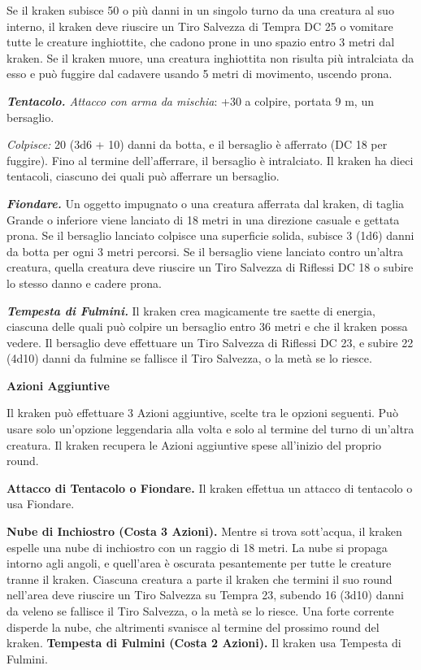 \begin{multicols}{2}
	Se il kraken subisce 50 o più danni in un singolo turno da una creatura al suo interno, il kraken deve riuscire un Tiro Salvezza di Tempra DC 25 o vomitare tutte le creature inghiottite, che cadono prone in uno spazio entro 3 metri dal kraken. Se il kraken muore, una creatura inghiottita non risulta più intralciata da esso e può fuggire dal cadavere usando 5 metri di movimento, uscendo prona.

	\textit{\textbf{Tentacolo.} Attacco con arma da mischia}: +30 a colpire, portata 9 m, un bersaglio.

	\textit{Colpisce:} 20 (3d6 + 10) danni da botta, e il bersaglio è afferrato (DC 18 per fuggire). Fino al termine dell'afferrare, il bersaglio è intralciato. Il kraken ha dieci tentacoli, ciascuno dei quali può afferrare un bersaglio.

	\textit{\textbf{Fiondare.}} Un oggetto impugnato o una creatura afferrata dal kraken, di taglia Grande o inferiore viene lanciato di 18 metri in una direzione casuale e gettata prona. Se il bersaglio lanciato colpisce una superficie solida, subisce 3 (1d6) danni da botta per ogni 3 metri percorsi. Se il bersaglio viene lanciato contro un'altra creatura, quella creatura deve riuscire un Tiro Salvezza di Riflessi DC 18 o subire lo stesso danno e cadere prona.

	\textit{\textbf{Tempesta di Fulmini.}} Il kraken crea magicamente tre saette di energia, ciascuna delle quali può colpire un bersaglio entro 36 metri e che il kraken possa vedere. Il bersaglio deve effettuare un Tiro Salvezza di Riflessi DC 23, e subire 22 (4d10) danni da fulmine se fallisce il Tiro Salvezza, o la metà se lo riesce.

	\textbf{Azioni Aggiuntive}

	Il kraken può effettuare 3 Azioni aggiuntive, scelte tra le opzioni seguenti. Può usare solo un'opzione leggendaria alla volta e solo al termine del turno di un'altra creatura. Il kraken recupera le Azioni aggiuntive spese all'inizio del proprio round.

	\textbf{Attacco di Tentacolo o Fiondare.} Il kraken effettua un attacco di tentacolo o usa Fiondare.

	\textbf{Nube di Inchiostro (Costa 3 Azioni).} Mentre si trova sott'acqua, il kraken espelle una nube di inchiostro con un raggio di 18 metri. La nube si propaga intorno agli angoli, e quell'area è oscurata pesantemente per tutte le creature tranne il kraken. Ciascuna creatura a parte il kraken che termini il suo round nell'area deve riuscire un Tiro Salvezza su Tempra 23, subendo 16 (3d10) danni da veleno se fallisce il Tiro Salvezza, o la metà se lo riesce. Una forte corrente disperde la nube, che altrimenti svanisce al termine del prossimo round del kraken. \textbf{Tempesta di Fulmini (Costa 2 Azioni).} Il kraken usa Tempesta di Fulmini.


\end{multicols}
